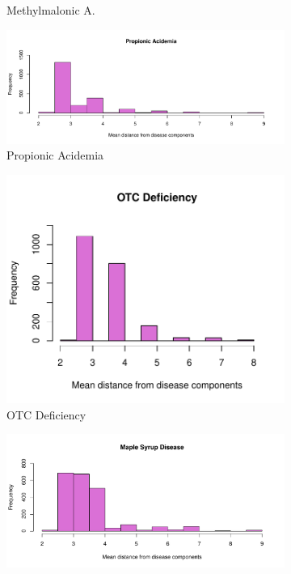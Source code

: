\begin{figure}[h!]
\begin{subfigure}[b]{0.3\textwidth}
         \caption{Methylmalonic A.}
         \label{fig:Methylmalonic Acidemia}
     \end{subfigure}
     \hfill
     \begin{subfigure}[b]{0.3\textwidth}
         \centering
         \includegraphics[scale=0.25]{Images/Propionic Acidemia.pdf}
         \caption{Propionic Acidemia}
         \label{fig:Propionic Acidemia}
     \end{subfigure}
     \hfill
     \begin{subfigure}[b]{0.3\textwidth}
         \centering
         \includegraphics[scale=0.25]{Images/OTC Deficiency.pdf}
         \caption{OTC Deficiency}
         \label{fig:OTC}
     \end{subfigure}
     \hfill
      \begin{subfigure}[b]{0.3\textwidth}
         \centering
         \includegraphics[scale=0.25]{Images/Maple Syrup Disease.pdf}

\end{subfigure}
\end{figure}
